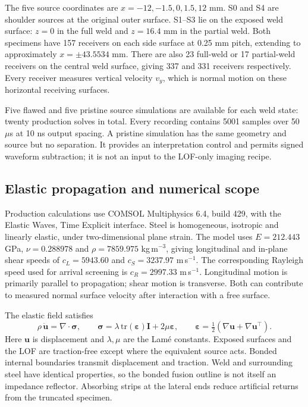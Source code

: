 The five source coordinates are $x=-12,-1.5,0,1.5,12$ mm. S0 and S4 are shoulder sources at the original outer surface. S1--S3 lie on the exposed weld surface: $z=0$ in the full weld and $z=16.4$ mm in the partial weld. Both specimens have 157 receivers on each side surface at 0.25 mm pitch, extending to approximately $x=\pm43.5534$ mm. There are also 23 full-weld or 17 partial-weld receivers on the central weld surface, giving 337 and 331 receivers respectively. Every receiver measures vertical velocity $v_y$, which is normal motion on these horizontal receiving surfaces.

Five flawed and five pristine source simulations are available for each weld state: twenty production solves in total. Every recording contains 5001 samples over 50 $\mu$s at 10 ns output spacing. A pristine simulation has the same geometry and source but no separation. It provides an interpretation control and permits signed waveform subtraction; it is not an input to the LOF-only imaging recipe.

\subsection{Elastic propagation and numerical scope}
Production calculations use COMSOL Multiphysics 6.4, build 429, with the Elastic Waves, Time Explicit interface. Steel is homogeneous, isotropic and linearly elastic, under two-dimensional plane strain. The model uses $E=212.443$ GPa, $\nu=0.288978$ and $\rho=7859.975$ kg\,m$^{-3}$, giving longitudinal and in-plane shear speeds of $c_L=5943.60$ and $c_S=3237.97$ m\,s$^{-1}$. The corresponding Rayleigh speed used for arrival screening is $c_R=2997.33$ m\,s$^{-1}$. Longitudinal motion is primarily parallel to propagation; shear motion is transverse. Both can contribute to measured normal surface velocity after interaction with a free surface.

The elastic field satisfies
\begin{equation}
 \rho\,\ddot{\mathbf u}=\nabla\!\cdot\boldsymbol\sigma,
 \qquad \boldsymbol\sigma=\lambda\,\mathrm{tr}(\boldsymbol\varepsilon)\mathbf I
                 +2\mu\boldsymbol\varepsilon,
 \qquad \boldsymbol\varepsilon=\tfrac12(\nabla\mathbf u+\nabla\mathbf u^{\top}).
\end{equation}
Here $\mathbf u$ is displacement and $\lambda,\mu$ are the Lam\'e constants. Exposed surfaces and the LOF are traction-free except where the equivalent source acts. Bonded internal boundaries transmit displacement and traction. Weld and surrounding steel have identical properties, so the bonded fusion outline is not itself an impedance reflector. Absorbing strips at the lateral ends reduce artificial returns from the truncated specimen.

